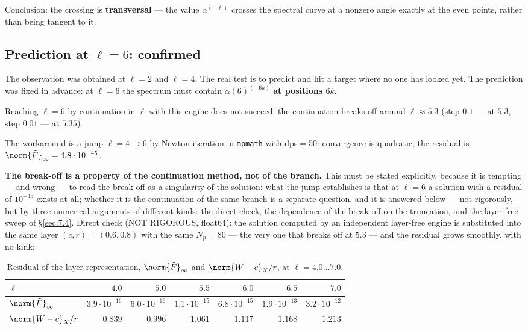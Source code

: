 Conclusion: the crossing is \textbf{transversal} --- the value $\alpha^{(-\ell)}$
crosses the spectral curve at a nonzero angle exactly at the even
points, rather than being tangent to it.


\subsection{Prediction at $\ell = 6$: confirmed}
\label{sec:8.5}

The observation was obtained at $\ell = 2$ and $\ell = 4$. The real test is to
predict and hit a target where no one has looked yet. The prediction
was fixed in advance: at $\ell = 6$ the spectrum must contain $\alpha(6)^{(-6k)}$
\textbf{at positions $6k$}.

Reaching $\ell = 6$ by continuation in $\ell$ with this engine does not
succeed: the continuation breaks off around \textbf{$\ell \approx 5.3$} (step $0.1$ ---
at $5.3$, step $0.01$ --- at $5.35$).

The workaround is a jump $\ell = 4 \to 6$ by Newton iteration in \texttt{mpmath}
with dps$=$50: convergence is quadratic, the residual is
$\norm{\tilde{F}}_{\infty} = 4.8\cdot 10^{-45}$.

\textbf{The break-off is a property of the continuation method, not of the
branch.} This must be stated explicitly, because it is tempting ---
and wrong --- to read the break-off as a singularity of the solution:
what the jump establishes is that at $\ell = 6$ a solution with a residual of
$10^{-45}$ exists at all; whether it is the continuation of the same branch is
a separate question, and it is answered below --- not rigorously, but by three
numerical arguments of different kinds: the direct check, the dependence of the
break-off on the truncation, and the layer-free sweep of \S\ref{sec:7.4}. Direct check (NOT RIGOROUS, float64): the solution computed
by an independent layer-free engine is substituted into the same
layer $(c, r) = (0.6, 0.8)$ with the same $N_{p} = 80$ --- the very one
that breaks off at $5.3$ --- and the residual grows smoothly, with no
kink:

\begin{table}[ht]
\centering
\caption{Residual of the layer representation, $\norm{\tilde{F}}_{\infty}$ and $\norm{W-c}_{X}/r$, at $\ell = 4.0 \dots 7.0$.}
\label{tab:residual-layer}
{\footnotesize\setlength{\tabcolsep}{4pt}
\begin{tabular}{lrrrrrr}
\toprule
$\ell$ & $4.0$ & $5.0$ & $5.5$ & $6.0$ & $6.5$ & $7.0$ \\
\midrule
$\norm{\tilde{F}}_{\infty}$ & $3.9\cdot 10^{-16}$ & $6.0\cdot 10^{-16}$ & $1.1\cdot 10^{-15}$ & $6.8\cdot 10^{-15}$ & $1.9\cdot 10^{-13}$ & $3.2\cdot 10^{-12}$ \\
$\norm{W-c}_{X}/r$ & $0.839$ & $0.996$ & $1.061$ & $1.117$ & $1.168$ & $1.213$ \\
\bottomrule
\end{tabular}}
\end{table}

